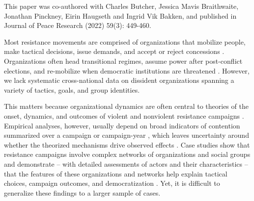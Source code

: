 \begin{footnotesize}
This paper was co-authored with Charles Butcher, Jessica Mavis
Braithwaite, Jonathan Pinckney, Eirin Haugseth and Ingrid Vik Bakken, and
published in Journal of Peace Research (2022) 59(3): 449-460.
\end{footnotesize}

Most resistance movements are comprised of organizations that mobilize people,
make tactical decisions, issue demands, and accept or reject concessions
\citep{Haggard2016, Metternich2013, Braithwaite2020, Cunningham2017a,
McAdam2010, Tarrow2011}. Organizations often head transitional regimes, assume
power after post-conflict elections, and re-mobilize when democratic
institutions are threatened \citep{Haggard2016, Wood2000}. However, we lack
systematic cross-national data on dissident organizations spanning a variety of
tactics, goals, and group identities. 

This matters because organizational dynamics are often central to theories of
the onset, dynamics, and outcomes of violent and nonviolent resistance campaigns
\citep{Bethke_2019, Brancati2016, Chenoweth2011, Celestino2013, Huang2016,
Schaftenaar2017, Thurber2019, Sutton2014, Svensson2011, Belgioioso2018}.
Empirical analyses, however, usually depend on broad indicators of contention
summarized over a campaign or campaign-year \citep{Chenoweth2011}, which leaves
uncertainty around whether the theorized mechanisms drive observed effects
\citep{Schock2005}. Case studies show that resistance campaigns involve complex
networks of organizations and social groups \citep{Metternich2013, Schock2005,
Osa2003} and demonstrate -- with detailed assessments of actors and their
characteristics -- that the features of these organizations and networks help
explain tactical choices, campaign outcomes, and democratization
\citep{Pearlman2011, Thurber2019, Nepstad2011, Schock2005, Wood2000,
Collier1999}. Yet, it is difficult to generalize these findings to a larger
sample of cases.  

